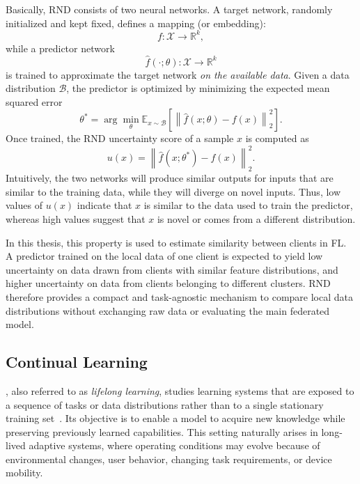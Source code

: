 Basically, 
 \gls{RND} consists of two neural networks. 
%
A target network, 
 randomly initialized and kept fixed, defines a mapping (or embedding):
\begin{equation}
    f: \mathcal{X} \rightarrow \mathbb{R}^{k},
\end{equation}
while a predictor network
\begin{equation}
    \hat{f}(\cdot;\theta): \mathcal{X} \rightarrow \mathbb{R}^{k}
\end{equation}
is trained to approximate the target network \emph{on the available data}.
%
Given a data distribution $\mathcal{B}$,
 the predictor is optimized by minimizing the expected mean squared error
\begin{equation}\label{eq:rnd}
    \theta^{*}
    =
    \arg\min_{\theta}
    \mathbb{E}_{x \sim \mathcal{B}}
    \left[
        \left\|
            \hat{f}(x;\theta) - f(x)
        \right\|_2^2
    \right].
\end{equation}
%
Once trained,
 the \gls{RND} uncertainty score of a sample $x$ is computed as
%
\begin{equation}
    u(x)
    =
    \left\|
        \hat{f}(x;\theta^{*}) - f(x)
    \right\|_2^2 .
\end{equation}
%
Intuitively,
the two networks will produce similar outputs for inputs that are similar to the training data,
while they will diverge on novel inputs.
%
Thus, low values of $u(x)$ indicate that $x$ is similar to the data used to train the predictor,
 whereas high values suggest that $x$ is novel or comes from a different distribution.

In this thesis, 
 this property is used to estimate similarity between clients in \gls{FL}. 
% 
A predictor trained on the local data of one client is expected 
 to yield low uncertainty on data drawn from clients with similar feature distributions,
 and higher uncertainty on data from clients belonging to different clusters.
%
\gls{RND} therefore provides a compact and task-agnostic mechanism 
 to compare local data distributions without exchanging raw data 
 or evaluating the main federated model.


\subsection{Continual Learning}
\label{subsec:continual-learning}

, 
 also referred to as \emph{lifelong learning}, 
 studies learning systems that are exposed to a sequence of tasks or data distributions
 rather than to a single stationary training set~\cite{DBLP:journals/nn/ParisiKPKW19}.
%
Its objective is to enable a model to acquire new knowledge 
 while preserving previously learned capabilities.
%
This setting naturally arises in long-lived adaptive systems, 
 where operating conditions may evolve because of environmental changes, 
 user behavior, changing task requirements, or device mobility.

